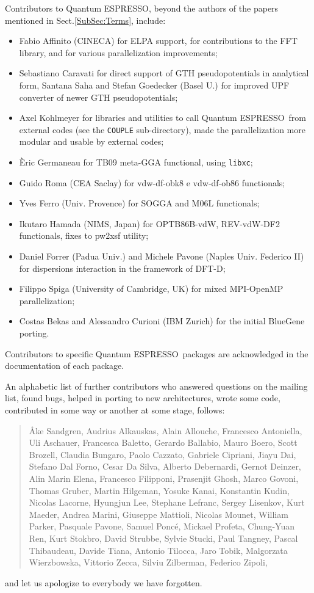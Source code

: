 \documentclass[12pt,a4paper]{article}
\def\qe{{\sc Quantum ESPRESSO}}
\begin{document}
Contributors to \qe, beyond the authors of the papers
mentioned in Sect.\ref{SubSec:Terms}, include:
\begin{itemize}
  \item Fabio Affinito (CINECA) for ELPA support, for contributions
  to the FFT library, and for various parallelization improvements;
  \item Sebastiano Caravati for direct support of GTH pseudopotentials
  in analytical form, Santana Saha and Stefan Goedecker (Basel U.)
  for improved UPF converter of newer GTH pseudopotentials;
  \item Axel Kohlmeyer for libraries and utilities to call \qe\
  from external codes (see the \texttt{COUPLE} sub-directory), made the
  parallelization more modular and usable by external codes;
  \item \`Eric Germaneau for TB09 meta-GGA functional, using \texttt{libxc};
  \item Guido Roma (CEA Saclay) for  vdw-df-obk8  e vdw-df-ob86 functionals; 
  \item Yves Ferro (Univ. Provence) for SOGGA and M06L functionals; 
  \item Ikutaro Hamada (NIMS, Japan) for OPTB86B-vdW, REV-vdW-DF2
    functionals, fixes to pw2xsf utility;
  \item Daniel Forrer (Padua Univ.) and Michele Pavone
  (Naples Univ. Federico II) for dispersions interaction in the
  framework of DFT-D;
  \item Filippo Spiga (University of Cambridge, UK) for mixed MPI-OpenMP parallelization;
  \item Costas Bekas and Alessandro Curioni (IBM Zurich) for the initial
  BlueGene porting.
\end{itemize}

Contributors to specific \qe\ packages are acknowledged in the
documentation of each package.

An alphabetic list of further
contributors who answered questions on the mailing list, found
bugs, helped in porting to new architectures, wrote some code,
contributed in some way or another at some stage, follows:
\begin{quote}
  {\AA}ke Sandgren, Audrius Alkauskas, Alain Allouche, Francesco Antoniella,
  Uli Aschauer,  Francesca Baletto, Gerardo Ballabio, Mauro Boero,
  Scott Brozell, Claudia Bungaro, Paolo Cazzato, Gabriele Cipriani,
  Jiayu Dai, Stefano Dal Forno, Cesar Da Silva, Alberto Debernardi,
  Gernot Deinzer, Alin Marin Elena, Francesco Filipponi, Prasenjit Ghosh,
  Marco Govoni, Thomas Gruber, Martin Hilgeman, Yosuke Kanai, Konstantin Kudin,
  Nicolas Lacorne, Hyungjun Lee, Stephane Lefranc, Sergey Lisenkov, Kurt Maeder,
  Andrea Marini, Giuseppe Mattioli, Nicolas Mounet, William Parker,
  Pasquale Pavone, Samuel Ponc\'e, Mickael Profeta, Chung-Yuan Ren,
  Kurt Stokbro, David Strubbe, Sylvie Stucki, Paul Tangney, Pascal Thibaudeau,
  Davide Tiana, Antonio Tilocca, Jaro Tobik, Malgorzata Wierzbowska,
  Vittorio Zecca, Silviu Zilberman, Federico Zipoli,
\end{quote}
and let us apologize to everybody we have forgotten.
\end{document}
